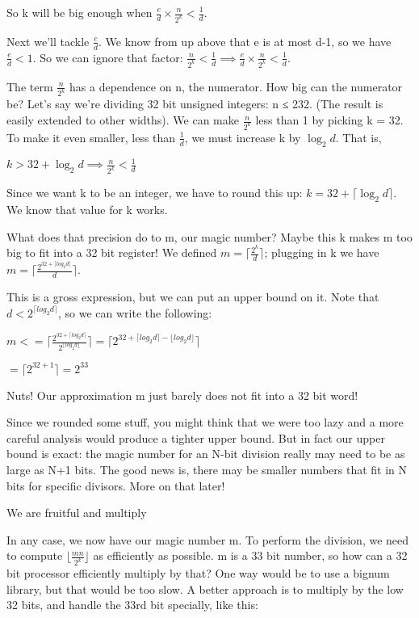 So k will be big enough when   $\frac e d \times \frac n {2^k} < \frac 1 d$.

Next we'll tackle $\frac e d$. We know from up above that e is at most d-1, so we have $\frac e d < 1$. So we can ignore that factor: $\frac n {2^k} < \frac 1 d \implies \frac e d \times \frac n {2^k} < \frac 1 d$.

The term $\frac n {2^k}$ has a dependence on n, the numerator. How big can the numerator be? Let's say we're dividing 32 bit unsigned integers: n ≤ 232. (The result is easily extended to other widths). We can make $\frac n {2^k}$ less than 1 by picking k = 32. To make it even smaller, less than $\frac 1 d$, we must increase k by $\log_2 d$. That is,

$k > 32 + \log_2 d \implies \frac n {2^k} < \frac 1 d$

Since we want k to be an integer, we have to round this up: $k = 32 + \lceil \log_2 d \rceil$. We know that value for k works.

What does that precision do to m, our magic number? Maybe this k makes m too big to fit into a 32 bit register! We defined $m = \lceil \frac {2^k} d \rceil$; plugging in k we have $m = \lceil \frac {2^{32 + \lceil log_2 d \rceil} } d \rceil $.

This is a gross expression, but we can put an upper bound on it. Note that $d < {2 ^ { \lceil log_2 d \rceil } }$, so we can write the following:

$m <= \lceil \frac {2^{32 + \lceil log_2 d \rceil} } {2 ^ { \lfloor log_2 d \rfloor } } \rceil = \lceil {2^{32 + \lceil log_2 d \rceil - \lfloor log_2 d \rfloor} } \rceil $

$ = \lceil {2 ^ { 32 + 1}} \rceil = 2^{33}$

Nuts! Our approximation m just barely does not fit into a 32 bit word!

Since we rounded some stuff, you might think that we were too lazy and a more careful analysis would produce a tighter upper bound. But in fact our upper bound is exact: the magic number for an N-bit division really may need to be as large as N+1 bits. The good news is, there may be smaller numbers that fit in N bits for specific divisors. More on that later!
 
We are fruitful and multiply

In any case, we now have our magic number m. To perform the division, we need to compute $ \lfloor \frac {m n} {2^k} \rfloor$ as efficiently as possible. m is a 33 bit number, so how can a 32 bit processor efficiently multiply by that? One way would be to use a bignum library, but that would be too slow. A better approach is to multiply by the low 32 bits, and handle the 33rd bit specially, like this:


